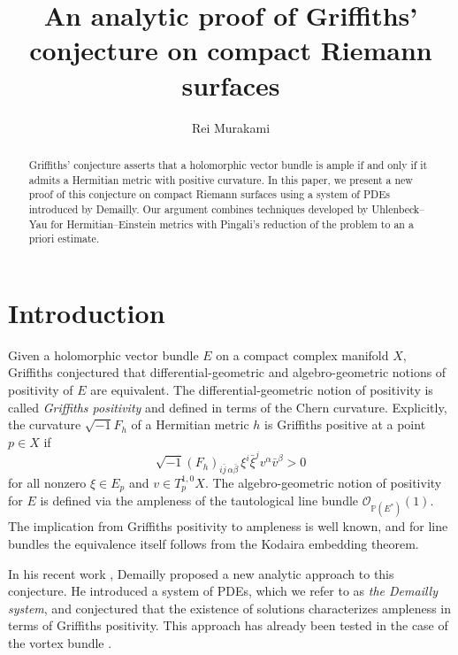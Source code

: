 \documentclass[a4, 12pt, 
]{amsart}
\author[R.\ Murakami]{Rei Murakami}
\numberwithin{equation}{section}
\theoremstyle{plain}
\theoremstyle{definition}
\theoremstyle{remark}
\begin{document}
\title[An analytic proof of Griffiths' conjecture on compact Riemann surfaces]{An analytic proof of Griffiths' conjecture on compact Riemann surfaces}

\begin{abstract}
    Griffiths' conjecture asserts that a holomorphic vector bundle is ample if and only if it admits a Hermitian metric with positive curvature.
    In this paper, we present a new proof of this conjecture on compact Riemann surfaces using a system of PDEs introduced by Demailly. 
    Our argument combines techniques developed by Uhlenbeck–Yau for Hermitian–Einstein metrics with Pingali's reduction of the problem to an a priori estimate.
\end{abstract}

\maketitle

\section{Introduction}
Given a holomorphic vector bundle $E$ on a compact complex manifold $X$, Griffiths conjectured that differential-geometric and algebro-geometric notions of positivity of $E$ are equivalent. 
The differential-geometric notion of positivity is called \textit{Griffiths positivity} and defined in terms of the Chern curvature.
Explicitly, the curvature $\sqrt{-1}F_h$ of a Hermitian metric $h$ is Griffiths positive at a point $p \in X$ if
$$\sqrt{-1}(F_h)_{i\bar{j}\,\alpha\bar{\beta}}\, \xi^i \bar{\xi}^j v^\alpha \bar{v}^\beta > 0$$
for all nonzero $\xi \in E_p$ and  $v \in T^{1,0}_pX$.
The algebro-geometric notion of positivity for $E$ is defined via the ampleness of the tautological line bundle $\mathcal{O}_{\mathbb{P}(E^*)}(1)$.
The implication from Griffiths positivity to ampleness is well known, and for line bundles the equivalence itself follows from the Kodaira embedding theorem.

In his recent work \cite{Dem21}, Demailly proposed a new analytic approach to this conjecture. He introduced a system of PDEs, which we refer to as \textit{the Demailly system}, and conjectured that the existence of solutions characterizes ampleness in terms of Griffiths positivity. 
This approach has already been tested in the case of the vortex bundle \cite{Man23}.
\end{document}
